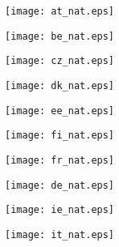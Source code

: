 \documentclass[a4paper, 12pt]{article}
\begin{document}
\clearpage


\begin{figure}[ht]
	\centering
		\texttt{[image: at\_nat.eps]}
\end{figure}

\clearpage

\begin{figure}[ht]
	\centering
		\texttt{[image: be\_nat.eps]}
\end{figure}


\clearpage


\begin{figure}[ht]
	\centering
		\texttt{[image: cz\_nat.eps]}
\end{figure}


\clearpage


\begin{figure}[ht]
	\centering
		\texttt{[image: dk\_nat.eps]}
\end{figure}


\clearpage


\begin{figure}[ht]
	\centering
		\texttt{[image: ee\_nat.eps]}
\end{figure}


\clearpage


\begin{figure}[ht]
	\centering
		\texttt{[image: fi\_nat.eps]}
\end{figure}

\clearpage


\begin{figure}[ht]
	\centering
		\texttt{[image: fr\_nat.eps]}
\end{figure}


\clearpage

\begin{figure}[ht]
	\centering
		\texttt{[image: de\_nat.eps]}
\end{figure}


\clearpage

\begin{figure}[ht]
	\centering
		\texttt{[image: ie\_nat.eps]}
\end{figure}


\clearpage


\begin{figure}[ht]
	\centering
		\texttt{[image: it\_nat.eps]}
\end{figure}
\end{document}
